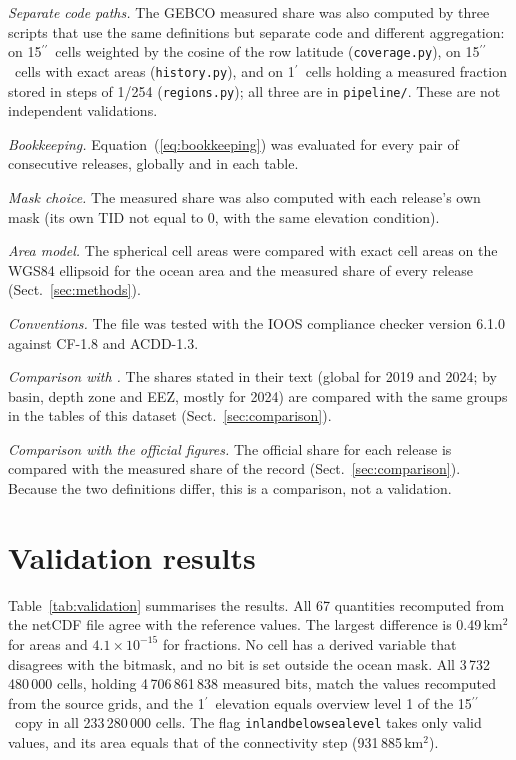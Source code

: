 \documentclass[essd, manuscript]{copernicus}
\newcommand{\as}{$^{\prime\prime}$}      %
\newcommand{\am}{$^{\prime}$}            %
\renewcommand{\_}{\usorig\allowbreak}
\begin{document}
\textit{Separate code paths.} The GEBCO\_2026 measured share was also computed by three scripts that use the same definitions but separate code and different aggregation: on 15\as\ cells weighted by the cosine of the row latitude (\texttt{coverage.py}), on 15\as\ cells with exact areas (\texttt{history.py}), and on 1\am\ cells holding a measured fraction stored in steps of 1/254 (\texttt{regions.py}); all three are in \texttt{pipeline/}. These are not independent validations.

\textit{Bookkeeping.} Equation~(\ref{eq:bookkeeping}) was evaluated for every pair of consecutive releases, globally and in each table.

\textit{Mask choice.} The measured share was also computed with each release's own mask (its own TID not equal to 0, with the same elevation condition).

\textit{Area model.} The spherical cell areas were compared with exact cell areas on the WGS84 ellipsoid for the ocean area and the measured share of every release (Sect.~\ref{sec:methods}).

\textit{Conventions.} The file was tested with the IOOS compliance checker version 6.1.0 against CF-1.8 and ACDD-1.3.

\textit{Comparison with \citet{niyazi2025}.} The shares stated in their text (global for 2019 and 2024; by basin, depth zone and EEZ, mostly for 2024) are compared with the same groups in the tables of this dataset (Sect.~\ref{sec:comparison}).

\textit{Comparison with the official figures.} The official share for each release is compared with the measured share of the record (Sect.~\ref{sec:comparison}).
Because the two definitions differ, this is a comparison, not a validation.

\section{Validation results}
\label{sec:valresults}

Table~\ref{tab:validation} summarises the results.
All 67 quantities recomputed from the netCDF file agree with the reference values.
The largest difference is 0.49\,km$^2$ for areas and $4.1 \times 10^{-15}$ for fractions.
No cell has a derived variable that disagrees with the bitmask, and no bit is set outside the ocean mask.
All 3\,732\,480\,000 cells, holding 4\,706\,861\,838 measured bits, match the values recomputed from the source grids, and the 1\am\ elevation equals overview level 1 of the 15\as\ copy in all 233\,280\,000 cells.
The flag \texttt{inland\_below\_sea\_level} takes only valid values, and its area equals that of the connectivity step (931\,885\,km$^2$).
\end{document}
